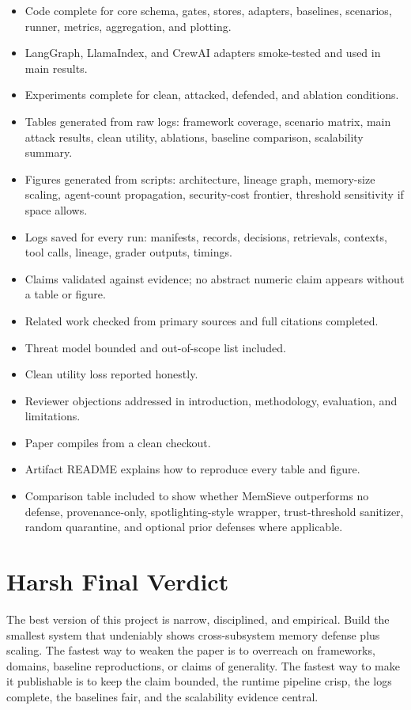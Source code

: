 \documentclass[11pt,oneside]{report}
\newcommand{\project}{MemSieve}
\begin{document}
\begin{itemize}
  \item Code complete for core schema, gates, stores, adapters, baselines, scenarios, runner, metrics,
        aggregation, and plotting.
  \item LangGraph, LlamaIndex, and CrewAI adapters smoke-tested and used in main results.
  \item Experiments complete for clean, attacked, defended, and ablation conditions.
  \item Tables generated from raw logs: framework coverage, scenario matrix, main attack results,
        clean utility, ablations, baseline comparison, scalability summary.
  \item Figures generated from scripts: architecture, lineage graph, memory-size scaling,
        agent-count propagation, security-cost frontier, threshold sensitivity if space allows.
  \item Logs saved for every run: manifests, records, decisions, retrievals, contexts, tool calls,
        lineage, grader outputs, timings.
  \item Claims validated against evidence; no abstract numeric claim appears without a table or
        figure.
  \item Related work checked from primary sources and full citations completed.
  \item Threat model bounded and out-of-scope list included.
  \item Clean utility loss reported honestly.
  \item Reviewer objections addressed in introduction, methodology, evaluation, and limitations.
  \item Paper compiles from a clean checkout.
  \item Artifact README explains how to reproduce every table and figure.
  \item Comparison table included to show whether \project{} outperforms no defense, provenance-only,
        spotlighting-style wrapper, trust-threshold sanitizer, random quarantine, and optional prior
        defenses where applicable.
\end{itemize}

\section{Harsh Final Verdict}

The best version of this project is narrow, disciplined, and empirical. Build the smallest system
that undeniably shows cross-subsystem memory defense plus scaling. The fastest way to weaken the
paper is to overreach on frameworks, domains, baseline reproductions, or claims of generality. The
fastest way to make it publishable is to keep the claim bounded, the runtime pipeline crisp, the
logs complete, the baselines fair, and the scalability evidence central.
\end{document}
